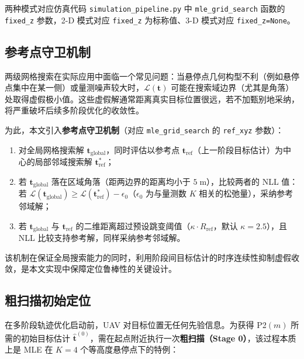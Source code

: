 两种模式对应仿真代码 \texttt{simulation\_pipeline.py} 中 \texttt{mle\_grid\_search} 函数的 \texttt{fixed\_z} 参数，2-D 模式对应 \texttt{fixed\_z} 为标称值、3-D 模式对应 \texttt{fixed\_z=None}。

\subsection{参考点守卫机制}

两级网格搜索在实际应用中面临一个常见问题：当悬停点几何构型不利（例如悬停点集中在某一侧）或量测噪声较大时，$\mathcal{L}(\mathbf{t})$ 可能在搜索域边界（尤其是角落）处取得虚假极小值。这些虚假解通常距离真实目标位置很远，若不加甄别地采纳，将严重破坏后续多阶段优化的收敛性。

为此，本文引入\textbf{参考点守卫机制}（对应 \texttt{mle\_grid\_search} 的 \texttt{ref\_xyz} 参数）：

\begin{enumerate}
    \item 对全局网格搜索解 $\mathbf{t}_{\mathrm{global}}$，同时评估以参考点 $\mathbf{t}_{\mathrm{ref}}$（上一阶段目标估计）为中心的局部邻域搜索解 $\mathbf{t}_{\mathrm{ref}}^*$；
    \item 若 $\mathbf{t}_{\mathrm{global}}$ 落在区域角落（距两边界的距离均小于 $5\;\mathrm{m}$），比较两者的 NLL 值：若 $\mathcal{L}(\mathbf{t}_{\mathrm{global}})\geq\mathcal{L}(\mathbf{t}_{\mathrm{ref}}^*)-\epsilon_0$（$\epsilon_0$ 为与量测数 $K$ 相关的松弛量），采纳参考邻域解；
    \item 若 $\mathbf{t}_{\mathrm{global}}$ 与 $\mathbf{t}_{\mathrm{ref}}$ 的二维距离超过预设跳变阈值（$\kappa\cdot R_{\mathrm{ref}}$，默认 $\kappa=2.5$），且 NLL 比较支持参考解，同样采纳参考邻域解。
\end{enumerate}

该机制在保证全局搜索能力的同时，利用阶段间目标估计的时序连续性抑制虚假收敛，是本文实现中保障定位鲁棒性的关键设计。

\subsection{粗扫描初始定位}

在多阶段轨迹优化启动前，UAV 对目标位置无任何先验信息。为获得 P2$(m)$ 所需的初始目标估计 $\hat{\mathbf{t}}^{(0)}$，需在起点附近执行一次\textbf{粗扫描（Stage 0）}，该过程本质上是 MLE 在 $K=4$ 个等高度悬停点下的特例：

